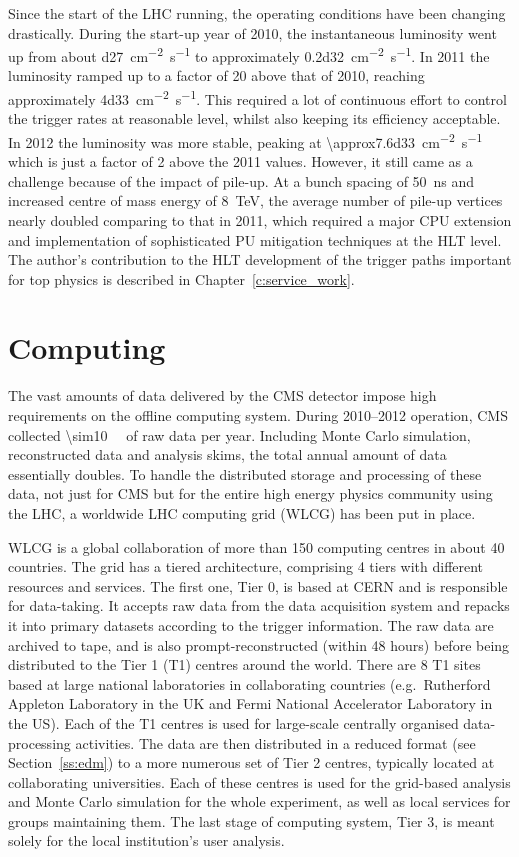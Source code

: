 Since the start of the LHC running, the operating conditions have been changing drastically. During the start-up year of
2010, the instantaneous luminosity went up from about \SI{d27}{\cm^{-2} s^{-1}} to approximately \SI{0.2d32}{\cm^{-2}
s^{-1}}. In 2011 the luminosity ramped up to a factor of \num{20} above that of 2010, reaching approximately
\SI{4d33}{\cm^{-2} s^{-1}}. This required a lot of continuous effort to control the trigger rates at reasonable level,
whilst also keeping its efficiency acceptable. In 2012 the luminosity was more stable, peaking at
\SI{\approx7.6d33}{\cm^{-2} s^{-1}} which is just a factor of 2 above the 2011 values. However, it still came as a
challenge because of the impact of pile-up. At a bunch spacing of \SI{50}{\ns} and increased centre of mass energy of
\SI{8}{\TeV}, the average number of pile-up vertices nearly doubled comparing to that in 2011, which required a major
CPU extension and implementation of sophisticated PU mitigation techniques at the HLT level. The author's contribution
to the HLT development of the trigger paths important for top physics is described in Chapter~\ref{c:service_work}.

\section{Computing}
\label{s:computing}
The vast amounts of data delivered by the CMS detector impose high requirements on the offline computing system. During
2010--2012 operation, CMS collected \SI{\sim10}{\peta\byte} of raw data per year. Including Monte Carlo simulation,
reconstructed data and analysis skims, the total annual amount of data essentially doubles. To handle the distributed
storage and processing of these data, not just for CMS but for the entire high energy physics community using the LHC, a
worldwide LHC computing grid (WLCG) has been put in place.

WLCG is a global collaboration of more than 150 computing centres in about 40 countries. The grid has a tiered
architecture, comprising 4 tiers with different resources and services. The first one, Tier 0, is based at CERN and is
responsible for data-taking. It accepts raw data from the data acquisition system and repacks it into primary datasets
according to the trigger information. The raw data are archived to tape, and is also prompt-reconstructed (within 48
hours) before being distributed to the Tier 1 (T1) centres around the world. There are 8 T1 sites based at large
national laboratories in collaborating countries (e.g.\ Rutherford Appleton Laboratory in the UK and Fermi National
Accelerator Laboratory in the US). Each of the T1 centres is used for large-scale centrally organised data-processing
activities. The data are then distributed in a reduced format (see Section~\ref{ss:edm}) to a more numerous set of Tier
2 centres, typically located at collaborating universities. Each of these centres is used for the grid-based analysis
and Monte Carlo simulation for the whole experiment, as well as local services for groups maintaining them. The last
stage of computing system, Tier 3, is meant solely for the local institution's user analysis.

